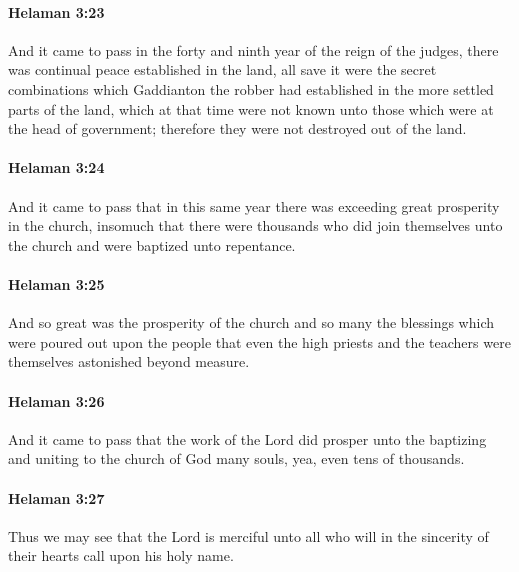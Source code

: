 		\paragraph{Helaman 3:23} %
			\label{HELAMAN-3-23}

			And it came to pass in the forty and ninth year of the reign of the judges,
			there was continual peace established in the land,
			all save it were the secret combinations
			which Gaddianton the robber had established
			in the more settled parts of the land,
			which at that time were not known
			unto those which were at the head of government;
			therefore they were not destroyed out of the land.

		\paragraph{Helaman 3:24} %
			\label{HELAMAN-3-24}

			And it came to pass that in this same year
			there was exceeding great prosperity in the church,
			insomuch that there were thousands who did join themselves unto the church
			and were baptized unto repentance.

		\paragraph{Helaman 3:25} %
			\label{HELAMAN-3-25}

			And so great was the prosperity of the church
			and so many the blessings which were poured out upon the people
			that even the high priests and the teachers
			were themselves astonished beyond measure.

		\paragraph{Helaman 3:26} %
			\label{HELAMAN-3-26}

			And it came to pass that the work of the Lord did prosper
			unto the baptizing and uniting to the church of God many souls,
			yea, even tens of thousands.

		\paragraph{Helaman 3:27} %
			\label{HELAMAN-3-27}

			Thus we may see that the Lord is merciful unto all
			who will in the sincerity of their hearts call upon his holy name.

